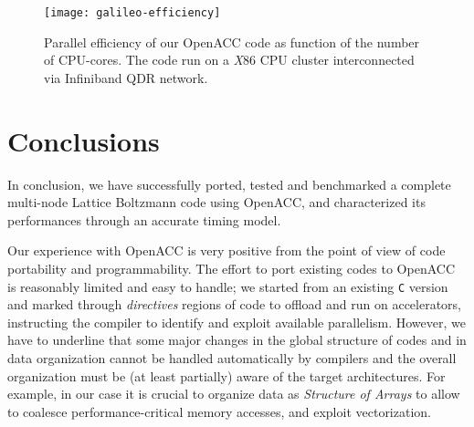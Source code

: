 \documentclass[times]{cpeauth}
\begin{document}

%
\begin{figure}[b]
\centering
\texttt{[image: galileo-efficiency]}
\caption{\label{galileo-efficiency} Parallel efficiency of our OpenACC code 
as function of the number of CPU-cores. The code run on a {\em X}86 CPU cluster 
interconnected via Infiniband QDR network.}
\end{figure}
%



\section{Conclusions}\label{sec:conclusions}

In conclusion, we have successfully ported, tested and benchmarked a complete 
multi-node Lattice Boltzmann code using OpenACC, and characterized its 
performances through an accurate timing model.

Our experience with OpenACC is very positive from the point of view of 
code portability and programmability.
%
The effort to port existing codes to OpenACC is reasonably limited and easy 
to handle; we started from an existing {\tt C} version 
and marked through {\em directives} regions of code to offload and 
run on accelerators, instructing the compiler to identify and exploit 
available parallelism.
%
However, we have to underline that some major changes in the global structure 
of codes and in data organization cannot be handled automatically by compilers 
and the overall organization must be (at least partially) aware of the target 
architectures. 
%
For example, in our case it is crucial to organize data as {\em Structure of Arrays} 
to allow to coalesce performance-critical memory accesses, and exploit vectorization.
\end{document}
